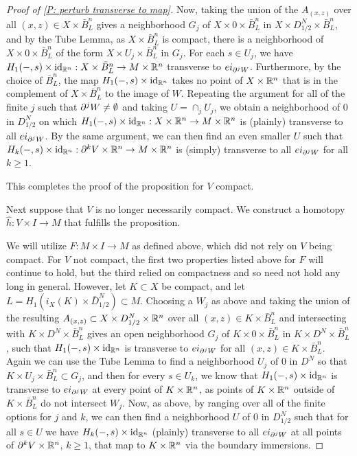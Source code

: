 \begin{proof}[Proof of \cref{P: perturb transverse to map}]
Now, taking the union of the $A_{(x,z)}$ over all $(x,z)\in X\times \bar B^n_L$ gives a neighborhood $G_j$ of $X\times 0\times \bar B^n_L$ in $X\times D_{1/2}^N\times \bar B^n_L$, and by the Tube Lemma, as $X\times \bar B^n_L$ is compact, there is a neighborhood of $X\times 0\times \bar B^n_L$ of the form $X\times U_j\times \bar B^n_L$ in $G_j$. For each $s\in U_j$, we have $H_1(-,s)\times \mathrm{id}_{\mathbb{R}^n}:X\times \bar B^n_L\to M\times \mathbb{R}^n$ transverse to $ei_{\partial^jW}$. Furthermore, by the choice of $\bar B^n_L$, the map $H_1(-,s)\times \mathrm{id}_{\mathbb{R}^n}$ takes no point of $X\times \mathbb{R}^n$ that is in the complement of $X\times \bar B^n_L$ to the image of $W$. Repeating the argument for all of the finite $j$ such that $\partial^jW\neq \emptyset$ and taking $U=\cap_j U_j$, we obtain a neighborhood of $0$ in $D_{1/2}^N$ on which $H_1(-,s)\times \mathrm{id}_{\mathbb{R}^n}:X\times \mathbb{R}^n\to M\times \mathbb{R}^n$ is (plainly) transverse to all $ei_{\partial^jW}$. By the same argument, we can then find an even smaller $U$ such that $H_k(-,s)\times \mathrm{id}_{\mathbb{R}^n}:\partial^{k}V\times \mathbb{R}^n\to M\times \mathbb{R}^n$ is (simply) transverse to all $ei_{\partial^jW}$ for all $k\geq 1$.


This completes the proof of the proposition for $V$ compact.


Next suppose that $V$ is no longer necessarily compact. We construct a homotopy $\hat h:V\times I\to M$ that fulfills the proposition.




We will utilize $F:M\times I\to M$ as defined above, which did not rely on $V$ being compact. For $V$ not compact, the first two properties listed above for $F$ will continue to hold, but the third relied on compactness and so need not hold any long in general.
However, let $K\subset X$ be compact, and let $L=H_1(i_X(K)\times \bar D_{1/2}^N)\subset M$.
Choosing a $W_j$ as above and taking the union of the resulting $A_{(x,z)}\subset X\times D_{1/2}^N\times \mathbb{R}^n$ over all $(x,z)\in K\times \bar B^n_L$ and intersecting with $K\times D^N\times \bar B^n_L$ gives an open neighborhood $G_j$ of $K\times 0\times \bar B^n_L$ in $K\times D^N\times \bar B^n_L$, such that
 $H_1(-,s)\times \mathrm{id}_{\mathbb{R}^n}$ is transverse to $ei_{\partial^jW}$ for all $(x,z)\in K\times \bar B^n_L$. Again we can use the Tube Lemma to find a neighborhood $U_j$ of $0$ in $D^N$ so that $K\times U_j\times \bar B^n_L \subset G_j$, and then for every $s\in U_k$, we know that $H_1(-,s)\times \mathrm{id}_{\mathbb{R}^n}$ is transverse to $ei_{\partial^jW}$ at every point of $K\times \mathbb{R}^n$, as points of $K\times \mathbb{R}^n$ outside of $K\times \bar B^n_L$ do not intersect $W_j$. Now, as above, by ranging over all of the finite options for $j$ and $k$, we can then find a neighborhood $U$ of $0$ in $D^N_{1/2}$ such that for all $s\in U$ we have $H_k(-,s)\times \mathrm{id}_{\mathbb{R}^n}$ (plainly) transverse to all $ei_{\partial^jW}$ at all points of $\partial^kV\times \mathbb{R}^n$, $k\geq 1$, that map to $K\times \mathbb{R}^n$ via the boundary immersions.


\end{proof}
